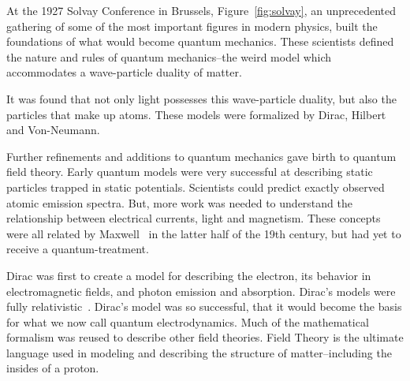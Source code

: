 At the 1927 Solvay Conference in Brussels, Figure~\ref{fig:solvay}, an
unprecedented gathering of some of the most important figures in modern physics,
built the foundations of what would become quantum mechanics. These scientists
defined the nature and rules of quantum mechanics--the weird model which
accommodates a wave-particle duality of matter. 

It was found that not only light possesses this wave-particle duality, but also
the particles that make up atoms. These models were formalized by Dirac, Hilbert
and Von-Neumann.

Further refinements and additions to quantum mechanics gave birth to quantum
field theory. Early quantum models were very successful at describing static
particles trapped in static potentials. Scientists could predict exactly
observed atomic emission spectra. But, more work was needed to understand the
relationship between electrical currents, light and magnetism.  These concepts
were all related by Maxwell~\cite{Maxwell1865} in the latter half of the 19th
century, but had yet to receive a quantum-treatment.

Dirac was first to create a model for describing the electron, its behavior in
electromagnetic fields, and photon emission and absorption. Dirac's models were
fully relativistic~\cite{Dirac}. Dirac's model was so successful, that it would
become the basis for what we now call quantum electrodynamics.  Much of the
mathematical formalism was reused to describe other field theories. Field Theory
is the ultimate language used in modeling and describing the structure of
matter--including the insides of a proton. 

